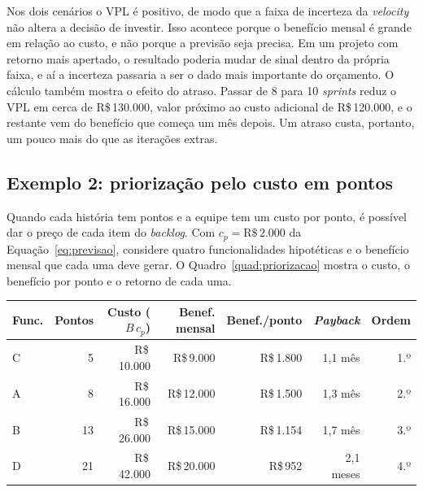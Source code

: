 Nos dois cenários o VPL é positivo, de modo que a faixa de incerteza da
\textit{velocity} não altera a decisão de investir. Isso acontece porque o
benefício mensal é grande em relação ao custo, e não porque a previsão seja
precisa. Em um projeto com retorno mais apertado, o resultado poderia mudar de
sinal dentro da própria faixa, e aí a incerteza passaria a ser o dado mais
importante do orçamento. O cálculo também mostra o efeito do atraso. Passar de 8
para 10 \textit{sprints} reduz o VPL em cerca de R\$\,130.000, valor próximo ao
custo adicional de R\$\,120.000, e o restante vem do benefício que começa um mês
depois. Um atraso custa, portanto, um pouco mais do que as iterações extras.

\subsection{Exemplo 2: priorização pelo custo em pontos}
\label{sub:ex-priorizacao}

Quando cada história tem pontos e a equipe tem um custo por ponto, é possível
dar o preço de cada item do \textit{backlog}. Com $c_p = \text{R\$}\,2.000$ da
Equação~\ref{eq:previsao}, considere quatro funcionalidades hipotéticas e o
benefício mensal que cada uma deve gerar. O Quadro~\ref{quad:priorizacao} mostra
o custo, o benefício por ponto e o retorno de cada uma.

\begin{quadro}[htbp]
  \caption{Priorização de quatro funcionalidades hipotéticas pelo custo em pontos}
  \label{quad:priorizacao}
  \small
  \begin{tabular}{@{}lrrrrrr@{}}
    \toprule
    \textbf{Func.} & \textbf{Pontos} & \textbf{Custo ($B\,c_p$)} & \textbf{Benef. mensal}
      & \textbf{Benef./ponto} & \textbf{\textit{Payback}} & \textbf{Ordem} \\
    \midrule
    C & 5  & R\$\,10.000 & R\$\,9.000  & R\$\,1.800 & 1,1 mês   & 1.º \\
    A & 8  & R\$\,16.000 & R\$\,12.000 & R\$\,1.500 & 1,3 mês   & 2.º \\
    B & 13 & R\$\,26.000 & R\$\,15.000 & R\$\,1.154 & 1,7 mês   & 3.º \\
    D & 21 & R\$\,42.000 & R\$\,20.000 & R\$\,952   & 2,1 meses & 4.º \\
    \bottomrule
  \end{tabular}
  \par\vspace{1ex}
\end{quadro}

